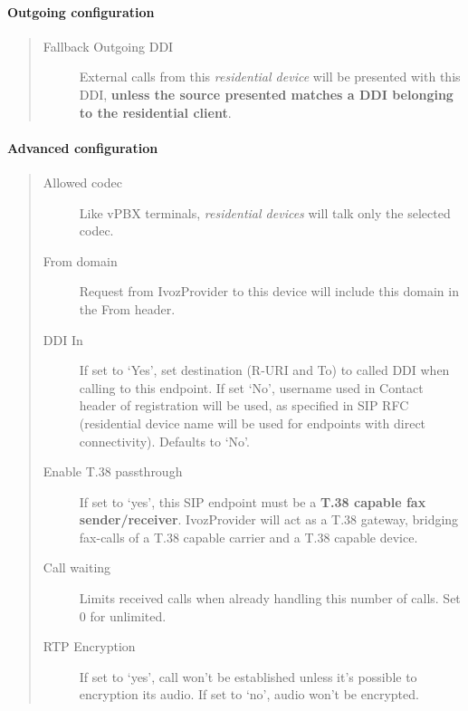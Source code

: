 \documentclass[letterpaper,10pt,english]{sphinxmanual}
\begin{document}
\paragraph{Outgoing configuration}
\label{administration_portal/client/residential/residential_devices:outgoing-configuration}\begin{quote}
\begin{description}
\item[{Fallback Outgoing DDI}] \leavevmode
External calls from this \emph{residential device} will be presented with this DDI, \textbf{unless
the source presented matches a DDI belonging to the residential client}.

\end{description}
\end{quote}


\paragraph{Advanced configuration}
\label{administration_portal/client/residential/residential_devices:advanced-configuration}\begin{quote}
\begin{description}
\item[{Allowed codec}] \leavevmode
Like vPBX terminals, \emph{residential devices} will talk only the selected codec.

\item[{From domain}] \leavevmode
Request from IvozProvider to this device will include this domain in
the From header.

\item[{DDI In}] \leavevmode
If set to `Yes', set destination (R-URI and To) to called DDI when calling to this endpoint. If set `No', username
used in Contact header of registration will be used, as specified in SIP RFC (residential device name will be used
for endpoints with direct connectivity). Defaults to `No'.

\item[{Enable T.38 passthrough}] \leavevmode
If set to `yes', this SIP endpoint must be a \textbf{T.38 capable fax sender/receiver}. IvozProvider
will act as a T.38 gateway, bridging fax-calls of a T.38 capable carrier and a T.38 capable device.

\item[{Call waiting}] \leavevmode
Limits received calls when already handling this number of calls. Set 0 for unlimited.

\item[{RTP Encryption}] \leavevmode
If set to `yes', call won't be established unless it's possible to encryption its audio. If set to `no',
audio won't be encrypted.

\end{description}
\end{quote}
\end{document}
